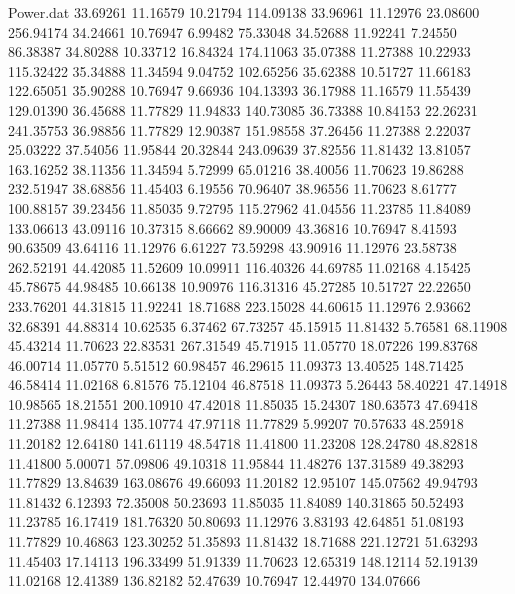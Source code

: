 \begin{filecontents}{Power.dat}
  33.69261   11.16579   10.21794  114.09138
  33.96961   11.12976   23.08600  256.94174
  34.24661   10.76947    6.99482   75.33048
  34.52688   11.92241    7.24550   86.38387
  34.80288   10.33712   16.84324  174.11063
  35.07388   11.27388   10.22933  115.32422
  35.34888   11.34594    9.04752  102.65256
  35.62388   10.51727   11.66183  122.65051
  35.90288   10.76947    9.66936  104.13393
  36.17988   11.16579   11.55439  129.01390
  36.45688   11.77829   11.94833  140.73085
  36.73388   10.84153   22.26231  241.35753
  36.98856   11.77829   12.90387  151.98558
  37.26456   11.27388    2.22037   25.03222
  37.54056   11.95844   20.32844  243.09639
  37.82556   11.81432   13.81057  163.16252
  38.11356   11.34594    5.72999   65.01216
  38.40056   11.70623   19.86288  232.51947
  38.68856   11.45403    6.19556   70.96407
  38.96556   11.70623    8.61777  100.88157
  39.23456   11.85035    9.72795  115.27962
  41.04556   11.23785   11.84089  133.06613
  43.09116   10.37315    8.66662   89.90009
  43.36816   10.76947    8.41593   90.63509
  43.64116   11.12976    6.61227   73.59298
  43.90916   11.12976   23.58738  262.52191
  44.42085   11.52609   10.09911  116.40326
  44.69785   11.02168    4.15425   45.78675
  44.98485   10.66138   10.90976  116.31316
  45.27285   10.51727   22.22650  233.76201
  44.31815   11.92241   18.71688  223.15028
  44.60615   11.12976    2.93662   32.68391
  44.88314   10.62535    6.37462   67.73257
  45.15915   11.81432    5.76581   68.11908
  45.43214   11.70623   22.83531  267.31549
  45.71915   11.05770   18.07226  199.83768
  46.00714   11.05770    5.51512   60.98457
  46.29615   11.09373   13.40525  148.71425
  46.58414   11.02168    6.81576   75.12104
  46.87518   11.09373    5.26443   58.40221
  47.14918   10.98565   18.21551  200.10910
  47.42018   11.85035   15.24307  180.63573
  47.69418   11.27388   11.98414  135.10774
  47.97118   11.77829    5.99207   70.57633
  48.25918   11.20182   12.64180  141.61119
  48.54718   11.41800   11.23208  128.24780
  48.82818   11.41800    5.00071   57.09806
  49.10318   11.95844   11.48276  137.31589
  49.38293   11.77829   13.84639  163.08676
  49.66093   11.20182   12.95107  145.07562
  49.94793   11.81432    6.12393   72.35008
  50.23693   11.85035   11.84089  140.31865
  50.52493   11.23785   16.17419  181.76320
  50.80693   11.12976    3.83193   42.64851
  51.08193   11.77829   10.46863  123.30252
  51.35893   11.81432   18.71688  221.12721
  51.63293   11.45403   17.14113  196.33499
  51.91339   11.70623   12.65319  148.12114
  52.19139   11.02168   12.41389  136.82182
  52.47639   10.76947   12.44970  134.07666

\end{filecontents}
